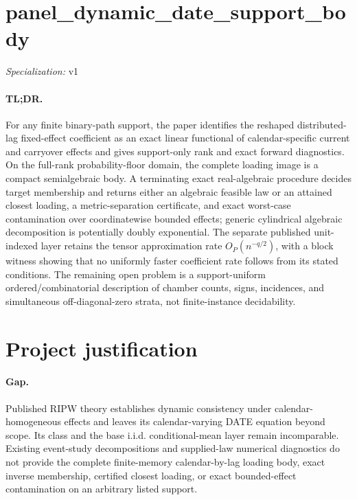 \documentclass{article}
\begin{document}
\sloppy

\section*{panel\_\allowbreak{}dynamic\_\allowbreak{}date\_\allowbreak{}support\_\allowbreak{}body}

\noindent\textit{Specialization:} v1\par

\paragraph{TL;DR.} For any finite binary-path support, the paper identifies the reshaped distributed-lag fixed-effect coefficient as an exact linear functional of calendar-specific current and carryover effects and gives support-only rank and exact forward diagnostics. On the full-rank probability-floor domain, the complete loading image is a compact semialgebraic body. A terminating exact real-algebraic procedure decides target membership and returns either an algebraic feasible law or an attained closest loading, a metric-separation certificate, and exact worst-case contamination over coordinatewise bounded effects; generic cylindrical algebraic decomposition is potentially doubly exponential. The separate published unit-indexed layer retains the tensor approximation rate \(O_P(n^{-q/2})\), with a block witness showing that no uniformly faster coefficient rate follows from its stated conditions. The remaining open problem is a support-uniform ordered/combinatorial description of chamber counts, signs, incidences, and simultaneous off-diagonal-zero strata, not finite-instance decidability.

\section{Project justification}

\paragraph{Gap.} Published RIPW theory establishes dynamic consistency under calendar-homogeneous effects and leaves its calendar-varying DATE equation beyond scope. Its class and the base i.i.d. conditional-mean layer remain incomparable. Existing event-study decompositions and supplied-law numerical diagnostics do not provide the complete finite-memory calendar-by-lag loading body, exact inverse membership, certified closest loading, or exact bounded-effect contamination on an arbitrary listed support.
\end{document}
